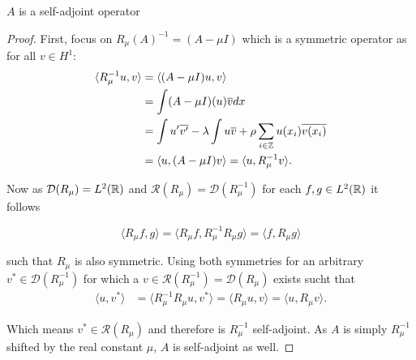 \begin{theorem}
	$A$ is a self-adjoint operator
		
	\begin{proof}
		First, focus on $R_{\mu}(A)^{-1} = (A - \mu I)$ which is a symmetric operator as for all $v \in H^{1}$:
			\begin{align*}
				\langle R_{\mu}^{-1} u, v \rangle & = \langle (A - \mu I) u, v \rangle \\
					& = \int (A - \mu I)(u) \overline{v} dx \\
					& = \int u'\overline{v'} -  \lambda \int u \overline{v} + \rho \sum_{i \in \mathbb{Z}} u(x_{i}) \overline{v(x_{i})} \\
					& = \langle u, (A - \mu I) v \rangle = \langle u,  R_{\mu}^{-1} v \rangle.
			\end{align*}

		Now as $\mathcal{D}(R_{\mu}) = L^{2}(\mathbb{R})$ and $\mathcal{R}(R_{\mu}) = \mathcal{D}(R_{\mu}^{-1})$ for each $f, g \in L^{2}(\mathbb{R})$ it follows
		
		\[  \langle R_{\mu} f, g \rangle =  \langle R_{\mu} f, R_{\mu}^{-1} R_{\mu} g \rangle = \langle f, R_{\mu} g \rangle \]
		
		such that $R_{\mu}$ is also symmetric. Using both symmetries for an arbitrary $v^{*} \in \mathcal{D}(R_{\mu}^{-1})$ for which a $v \in \mathcal{R}(R_{\mu}^{-1}) = \mathcal{D}(R_{\mu})$  exists sucht that
		\begin{align*}
			\langle u, v^{*} \rangle & = \langle R_{\mu}^{-1} R_{\mu} u , v^{*} \rangle = \langle R_{\mu} u, v \rangle  = \langle  u, R_{\mu} v \rangle.
		\end{align*}
		
		Which means $v^{*} \in \mathcal{R}(R_{\mu})$ and therefore is $R_{\mu}^{-1}$ self-adjoint. As $A$ is simply $R_{\mu}^{-1}$ shifted by the real constant $\mu$, $A$ is self-adjoint as well.		
	\end{proof}
\end{theorem}